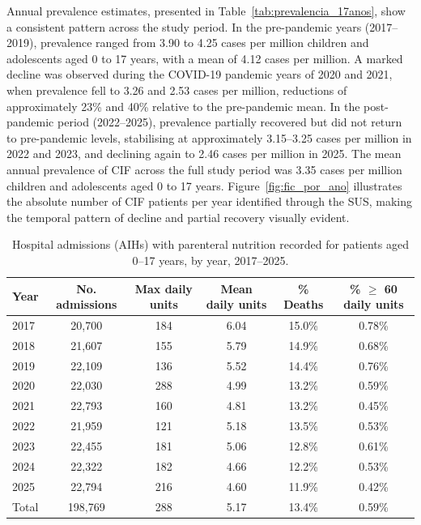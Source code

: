 \documentclass[12pt,a4paper]{article}
\theoremstyle{plain}
\theoremstyle{definition}
\theoremstyle{remark}
\begin{document}
Annual prevalence estimates, presented in Table~\ref{tab:prevalencia_17anos}, show a consistent pattern across the study period. In the pre-pandemic years (2017--2019), prevalence ranged from 3.90 to 4.25 cases per million children and adolescents aged 0 to 17 years, with a mean of 4.12 cases per million. A marked decline was observed during the COVID-19 pandemic years of 2020 and 2021, when prevalence fell to 3.26 and 2.53 cases per million, reductions of approximately 23\% and 40\% relative to the pre-pandemic mean. In the post-pandemic period (2022--2025), prevalence partially recovered but did not return to pre-pandemic levels, stabilising at approximately 3.15--3.25 cases per million in 2022 and 2023, and declining again to 2.46 cases per million in 2025. The mean annual prevalence of CIF across the full study period was 3.35 cases per million children and adolescents aged 0 to 17 years. Figure~\ref{fig:fic_por_ano} illustrates the absolute number of CIF patients per year identified through the SUS, making the temporal pattern of decline and partial recovery visually evident.

\begin{table}[ht]
    \centering
    \caption{Hospital admissions (AIHs) with parenteral nutrition recorded for patients aged 0--17 years, by year, 2017--2025.}
    \label{tab:pn_17anos}
    {\small
    \setlength{\tabcolsep}{3pt}
    \begin{tabular}{@{}lccccc@{}}
        \toprule
        Year & No. admissions & Max daily units & Mean daily units & \% Deaths & \% $\geq$ 60 daily units \\
        \midrule
        2017 & 20,700 & 184 & 6.04 & 15.0\% & 0.78\% \\
        2018 & 21,607 & 155 & 5.79 & 14.9\% & 0.68\% \\
        2019 & 22,109 & 136 & 5.52 & 14.4\% & 0.76\% \\
        2020 & 22,030 & 288 & 4.99 & 13.2\% & 0.59\% \\
        2021 & 22,793 & 160 & 4.81 & 13.2\% & 0.45\% \\
        2022 & 21,959 & 121 & 5.18 & 13.5\% & 0.53\% \\
        2023 & 22,455 & 181 & 5.06 & 12.8\% & 0.61\% \\
        2024 & 22,322 & 182 & 4.66 & 12.2\% & 0.53\% \\
        2025 & 22,794 & 216 & 4.60 & 11.9\% & 0.42\% \\
        \midrule
        Total & 198,769 & 288 & 5.17 & 13.4\% & 0.59\% \\
        \bottomrule
    \end{tabular}}
\end{table}
\end{document}
